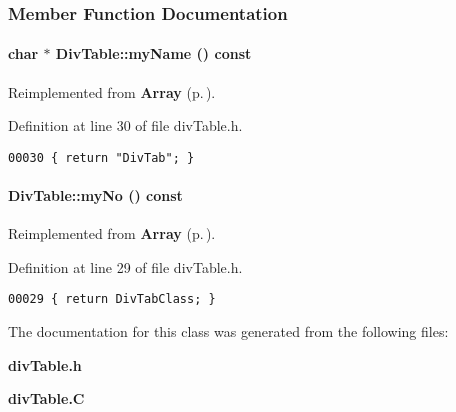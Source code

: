 \subsubsection{Member Function Documentation}
\label{DivTable_a3}
\paragraph{\setlength{\rightskip}{0pt plus 5cm}char $\ast$ Div\-Table::my\-Name () const\hspace{0.3cm}{\tt  [inline, virtual]}}\hfill



Reimplemented from {\bf Array} {\rm (p.\,\pageref{Array_a6})}.

Definition at line 30 of file div\-Table.h.\small\begin{verbatim}00030 { return "DivTab"; }
\end{verbatim}\normalsize 
\label{DivTable_a2}
\paragraph{ Div\-Table::my\-No () const\hspace{0.3cm}{\tt  [inline, virtual]}}\hfill



Reimplemented from {\bf Array} {\rm (p.\,\pageref{Array_a5})}.

Definition at line 29 of file div\-Table.h.\small\begin{verbatim}00029 { return DivTabClass; }
\end{verbatim}\normalsize 


The documentation for this class was generated from the following files:\begin{CompactItemize}
\item 
{\bf div\-Table.h}\item 
{\bf div\-Table.C}\end{CompactItemize}
